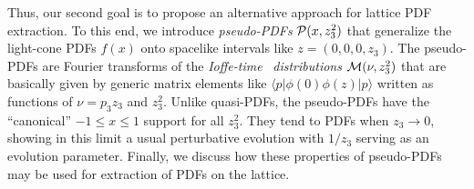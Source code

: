 Thus, our second goal is to propose an alternative approach for
lattice PDF extraction. To this end, we introduce
{\it pseudo-PDFs} ${\cal P} (x, z_3^2) $ that generalize
the light-cone PDFs $f(x)$ onto spacelike intervals like
$z=(0,0,0,z_3)$. The pseudo-PDFs are Fourier transforms
of the \mbox{{\it Ioffe-time} \cite{Ioffe:1969kf}} {\it distributions} \cite{Braun:1994jq}
${\cal M} (\nu, z_3^2)$
that are basically given by generic matrix elements like $
\langle p | \phi(0) \phi (z)|p \rangle $
written as functions of $\nu = p_3 z_3$ and $z_3^2$.
Unlike quasi-PDFs, the pseudo-PDFs have the ``canonical'' $-1 \leq x \leq 1$ support
for all $z_3^2$. They tend to PDFs when $z_3\to 0$,
showing in this limit a usual perturbative evolution
with $1/z_3$ serving as an evolution parameter.
Finally, we discuss how these properties of pseudo-PDFs may be used
for extraction of PDFs on the lattice.

